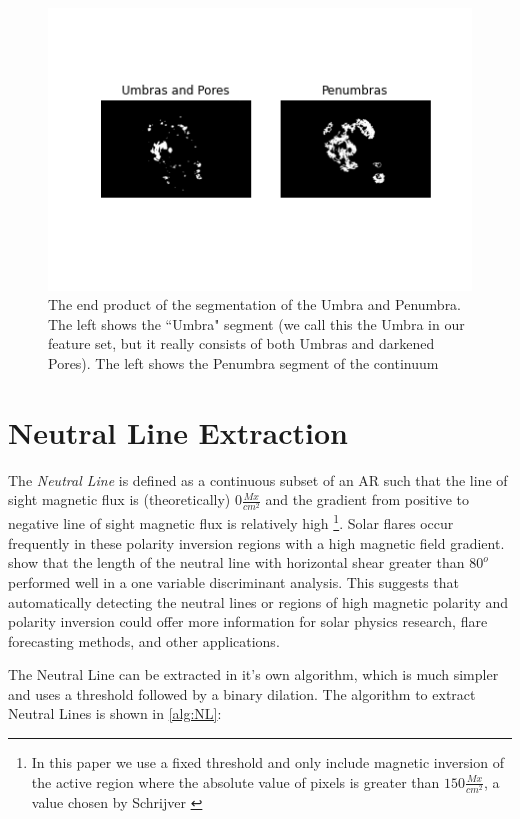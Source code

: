 \documentclass[defaultstyle,11pt]{thesis}
\begin{document}
\begin{figure}[h]
    \centering
    \includegraphics[width=0.7\linewidth]{ThesisFilePkg/figures/data/umbra_penumbra.png}
    \caption{The end product of the segmentation of the Umbra and Penumbra. The left shows the ``Umbra" segment (we call this the Umbra in our feature set, but it really consists of both Umbras and darkened Pores). The left shows the Penumbra segment of the continuum}
    \label{fig:UmbraPenumbrafinal}
\end{figure}

\section{Neutral Line Extraction}

The \textit{Neutral Line} is defined as a continuous subset of an AR such that the line of sight magnetic flux is (theoretically) $0\frac{Mx}{cm^2}$ and the gradient from positive to negative line of sight magnetic flux is relatively high \footnote{In this paper we use a fixed threshold and only include magnetic inversion of the active region where the absolute value of pixels is greater than $150 \frac{Mx}{cm^2}$, a value chosen by Schrijver \cite{schrijver}}. Solar flares occur frequently in these polarity inversion regions with a high magnetic field gradient. \cite{Properties2} show that the length of the neutral line with horizontal shear greater than $80^o$ performed well in a one variable discriminant analysis. This suggests that automatically detecting the neutral lines or regions of high magnetic polarity and polarity inversion could offer more information for solar physics research, flare forecasting methods, and other applications.

The Neutral Line can be extracted in it's own algorithm, which is much simpler and uses a threshold followed by a binary dilation. The algorithm to extract Neutral Lines is shown in \ref{alg:NL}:
\end{document}
